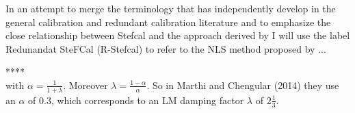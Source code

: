 \documentclass[useAMS,usenatbib]{mn2e}
\begin{document}
In an attempt to merge the terminology that has independently develop in the general calibration and redundant calibration literature and to emphasize the close
relationship between Stefcal and the approach derived by I will use the label Redunandat SteFCal (R-Stefcal) to refer to the NLS method proposed by ... 

****\\

with $\alpha = \frac{1}{1+\lambda}$. Moreover $\lambda = \frac{1-\alpha}{\alpha}$. So in Marthi and Chengular (2014) they use an $\alpha$ of 0.3, which corresponds to an LM damping factor $\lambda$
of $2\frac{1}{3}$.
\end{document}
